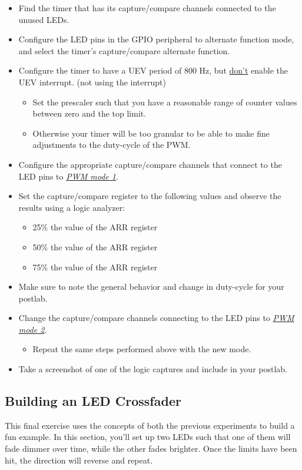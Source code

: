 \documentclass[11pt,fleqn]{book} %
\begin{document}
\begin{itemize}
    \item Find the timer that has its capture/compare channels connected to the unused LEDs. 
    \item Configure the LED pins in the GPIO peripheral to alternate function mode, and select the timer's capture/compare alternate function.
    \item Configure the timer to have a UEV period of 800 Hz, but \underline{don't} enable the UEV interrupt. (not using the interrupt)  
    \begin{itemize}
        \item Set the prescaler such that you have a reasonable range of counter values between zero and the top limit. 
        \item Otherwise your timer will be too granular to be able to make fine adjustments to the duty-cycle of the PWM.
    \end{itemize}
    
    \item Configure the appropriate capture/compare channels that connect to the LED pins to \underline{\textit{PWM mode 1}}. 
    \item Set the capture/compare register to the following values and observe the results using a logic analyzer:
    \begin{itemize}
        \item 25\% the value of the ARR register
        \item 50\% the value of the ARR register
        \item 75\% the value of the ARR register
    \end{itemize}
    \item Make sure to note the general behavior and change in duty-cycle for your postlab.
    \item Change the capture/compare channels connecting to the LED pins to \underline{\textit{PWM mode 2}}.  
    \begin{itemize}
        \item Repeat the same steps performed above with the new mode.
    \end{itemize}   
    \item Take a screenshot of one of the logic captures and include in your postlab. 
\end{itemize}


\subsection{Building an LED Crossfader}
This final exercise uses the concepts of both the previous experiments to build a fun example. In this section, you'll set up two LEDs such that one of them will fade dimmer over time, while the other fades brighter. Once the limits have been hit, the direction will reverse and repeat. 
\end{document}
